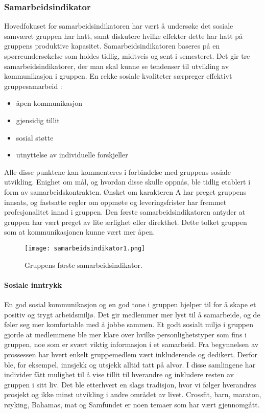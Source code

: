 \subsubsection{Samarbeidsindikator}

Hovedfokuset for samarbeidsindikatoren har vært å undersøke det sosiale samværet gruppen har hatt, samt diskutere hvilke effekter dette har hatt på gruppens produktive kapasitet.
Samarbeidsindikatoren baseres på en spørreundersøkelse som holdes tidlig, midtveis og sent i semesteret.
Det gir tre samarbeidsindikatorer, der man skal kunne se tendenser til utvikling av kommunikasjon i gruppen.
En rekke sosiale kvaliteter særpreger effektivt gruppesamarbeid \cite{orgorg}:

\begin{itemize}
	\item åpen kommunikasjon
	\item gjensidig tillit
	\item sosial støtte
	\item utnyttelse av individuelle forskjeller
\end{itemize}

Alle disse punktene kan kommenteres i forbindelse med gruppens sosiale utvikling.
Enighet om mål, og hvordan disse skulle oppnås, ble tidlig etablert i form av samarbeidskontrakten.
Ønsket om karakteren A har preget gruppens innsats, og fastsatte regler om oppmøte og leveringsfrister har fremmet profesjonalitet innad i gruppen.
Den første samarbeidsindikatoren antyder at gruppen har vært preget av lite ærlighet eller direkthet.
Dette tolket gruppen som at kommunikasjonen kunne vært mer åpen.

\begin{figure}[h!]
	\begin{center}
		\caption{Gruppens første samarbeidsindikator.}
		\label{fig:samarbeidsindikator}
		\texttt{[image: samarbeidsindikator1.png]}
	\end{center}
\end{figure}

\paragraph{Sosiale inntrykk}
En god sosial kommunikasjon og en god tone i gruppen hjelper til for å skape et positiv og trygt arbeidsmiljø.
Det gir medlemmer mer lyst til å samarbeide, og de føler seg mer komfortable med å jobbe sammen.
Et godt sosialt miljø i gruppen gjorde at medlemmene ble mer klare over hvilke personlighetstyper som fins i gruppen, noe som er svært viktig informasjon i et samarbeid.
Fra begynnelsen av prossessen har hvert enkelt gruppemedlem vært inkluderende og dedikert. 
Derfor ble, for eksempel, innsjekk og utsjekk alltid tatt på alvor.
I disse samlingene har individer fått mulighet til å vise tillit til hverandre og inkludere resten av gruppen i sitt liv. 
Det ble etterhvert en slags tradisjon, hvor vi følger hverandres prosjekt og ikke minst utvikling i andre området av livet.
Crossfit, barn, maraton, røyking, Bahamas, mat og Samfundet er noen temaer som har vært gjennomgått. \\

